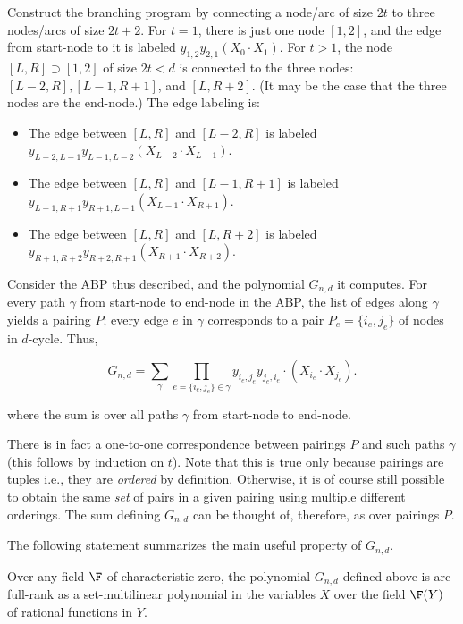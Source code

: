 \documentclass{article}
\begin{document}
Construct the branching program by connecting a node/arc of size $2t$ to three nodes/arcs of
size $2t + 2$. For $t = 1$, there is just one node $[1, 2]$, and the edge from start-node to it is labeled
$y_{1,2}y_{2,1}(X_0\cdot X_1)$. For $t > 1$, the node $[L, R] \supset [1, 2]$ of size $2t < d$ is connected to the three nodes:
$[L-2, R] , [L-1, R+ 1]$, and $[L, R+ 2]$. (It may be the case that the three nodes are the end-node.)
The edge labeling is: 
\begin{itemize}
    \item The edge  between $[L, R]$ and $[L-2, R]$ is labeled $y_{L-2,L-1}y_{L-1,L-2}(X_{L-2}\cdot X_{L-1})$.
    \item The
edge between $[L, R]$ and $[L - 1, R + 1]$ is labeled $y_{L-1,R+1}y_{R+1,L-1}(X_{L-1}\cdot X_{R+1})$.
    \item The edge between $[L, R]$
and $[L, R + 2]$ is labeled $y_{R+1,R+2}y_{R+2,R+1}(X_{R+1}\cdot X_{R+2})$.
\end{itemize}
  
Consider the ABP thus described, and the polynomial $G_{n,d}$ it computes. For every path $\gamma$
from start-node to end-node in the ABP, the list of edges along $\gamma$ yields a pairing $P$; every edge $e$
in $\gamma$ corresponds to a pair $P_e = \{i_e, j_e\}$ of nodes in $d$-cycle. Thus,

\begin{equation}\label{eq:poly-def}
  G_{n,d} = \sum_{\gamma} \prod_{e = \{i_e, j_e\} \in \gamma}y_{i_e,j_e}y_{j_e,i_e} \cdot (X_{i_e}\cdot X_{j_e}). 
\end{equation}

where the sum is over all paths $\gamma$ from start-node to end-node. 

\begin{remark}\label{rem:parings-paths}
There is in fact a one-to-one
correspondence between pairings $P$ and such paths $\gamma$ (this follows by induction on $t$). {Note that this is true only because pairings are tuples i.e., they are \emph{ordered} by definition. Otherwise, it is of course still possible to obtain the same \emph{set} of pairs in a given pairing using multiple different orderings.} The sum
defining $G_{n,d}$ can be thought of, therefore, as over pairings $P$.  
\end{remark}

The following statement summarizes the main useful property of $G_{n,d}$.

\begin{lem}\label{lem:Fn-VBP-props}
Over any field $\F$ of characteristic zero, the polynomial $ G_{n,d}$ defined above is arc-full-rank as a set-multilinear polynomial in the variables $X$ over the field $\F(Y)$ of rational functions
in $Y$.
\end{lem}
\end{document}
